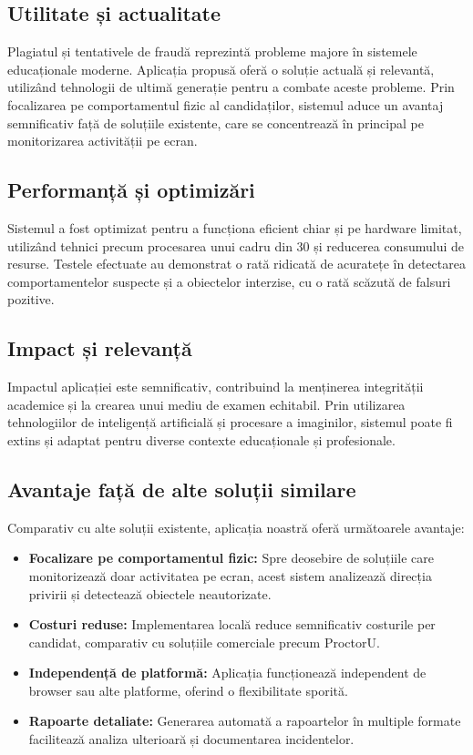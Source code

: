 \documentclass[12pt,a4paper]{article}
\begin{document}
\subsection{Utilitate și actualitate}

Plagiatul și tentativele de fraudă reprezintă probleme majore în sistemele educaționale moderne. Aplicația propusă oferă o soluție actuală și relevantă, utilizând tehnologii de ultimă generație pentru a combate aceste probleme. Prin focalizarea pe comportamentul fizic al candidaților, sistemul aduce un avantaj semnificativ față de soluțiile existente, care se concentrează în principal pe monitorizarea activității pe ecran.

\subsection{Performanță și optimizări}

Sistemul a fost optimizat pentru a funcționa eficient chiar și pe hardware limitat, utilizând tehnici precum procesarea unui cadru din 30 și reducerea consumului de resurse. Testele efectuate au demonstrat o rată ridicată de acuratețe în detectarea comportamentelor suspecte și a obiectelor interzise, cu o rată scăzută de falsuri pozitive.

\subsection{Impact și relevanță}

Impactul aplicației este semnificativ, contribuind la menținerea integrității academice și la crearea unui mediu de examen echitabil. Prin utilizarea tehnologiilor de inteligență artificială și procesare a imaginilor, sistemul poate fi extins și adaptat pentru diverse contexte educaționale și profesionale.

\subsection{Avantaje față de alte soluții similare}

Comparativ cu alte soluții existente, aplicația noastră oferă următoarele avantaje:
\begin{itemize}
    \item \textbf{Focalizare pe comportamentul fizic:} Spre deosebire de soluțiile care monitorizează doar activitatea pe ecran, acest sistem analizează direcția privirii și detectează obiectele neautorizate.
    \item \textbf{Costuri reduse:} Implementarea locală reduce semnificativ costurile per candidat, comparativ cu soluțiile comerciale precum ProctorU.
    \item \textbf{Independență de platformă:} Aplicația funcționează independent de browser sau alte platforme, oferind o flexibilitate sporită.
    \item \textbf{Rapoarte detaliate:} Generarea automată a rapoartelor în multiple formate facilitează analiza ulterioară și documentarea incidentelor.
\end{itemize}
\end{document}
